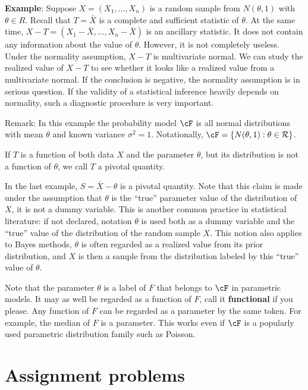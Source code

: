 \noindent
{\bf Example}: Suppose $X = (X_1, \ldots, X_n)$ is a random sample from
$N(\theta, 1)$ with $\theta \in R$. Recall that $T = \bar X$ is a complete
and sufficient statistic of $\theta$. At the same time,
$X - T = (X_1 -  \bar X, \ldots, X_n - \bar X)$ is an ancillary statistic.
It does not contain any information about the value of $\theta$.
However, it is not completely useless. Under the normality assumption,
$X-T$ is multivariate normal. We can study the realized value of $X-T$ to
see whether it looks like a realized value from a multivariate normal.
If the conclusion is negative, the normality assumption is in serious question.
If the validity of a statistical inference heavily depends on normality,
such a diagnostic procedure is very important.

Remark: In this example the probability model $\cF$ is all normal
distributions with mean $\theta$ and known variance $\sigma^2 = 1$.
Notationally, $\cF = \{ N(\theta, 1): \theta \in {\cal R}\}$.

\begin{defi}
If $T$ is a function of both data $X$ and the parameter $\theta$, but its
distribution is not a function of $\theta$, we call $T$ a pivotal quantity.
\end{defi}

In the last example, $S = \bar X - \theta$ is a pivotal quantity.
Note that this claim is made under the assumption that $\theta$ is
the ``true'' parameter value of the distribution of $X$, it is not a dummy
variable. This is another common practice in statistical literature:
if not declared, notation $\theta$ is used both as a dummy variable
and the ``true'' value of the distribution of the random sample $X$.
This notion also applies to Bayes methods, $\theta$ is often regarded
as a realized value from its prior distribution, and $X$ is then a sample
from the distribution labeled by this ``true'' value of $\theta$.

Note that the parameter $\theta$ is a label of $F$ that belongs to $\cF$
in parametric models. It may as well be regarded as a function of $F$,
call it {\bf functional} if you please. Any function of $F$ can be regarded
as a parameter by the same token. For example, the median of $F$ is
a parameter. This works even if $\cF$ is a popularly used parametric
distribution family such as Poisson. 

\section{Assignment problems}

